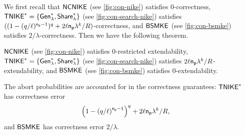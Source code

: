 We first recall that ${\mathsf{NCNIKE}}$ (see \cref{fig:con-nike}) satisfies $0$-correctness, $\mathsf{TNIKE}^*=\{{\mathsf{Gen}}_\lambda^*,{\mathsf{Share}}_\lambda^*\}$ (see \cref{fig:con-search-nike}) satisfies $((1- (q/\ell)^{\mathsf{n_p}-1})^{q} + 2\ell\mathsf{n_p}\lambda^k/R)$-correctness, and ${\mathsf{BSMKE}}$ (see \cref{fig:con-bsmke}) satisfies $2/\lambda$-correctness. Then we have the following theorem.
\begin{theorem}
\label{thm:extend-ncnike}
	${\mathsf{NCNIKE}}$ (see \cref{fig:con-nike}) satisfies $0$-restricted extendability, $\mathsf{TNIKE}^*=\{{\mathsf{Gen}}_\lambda^*,{\mathsf{Share}}_\lambda^*\}$ (see \cref{fig:con-search-nike}) satisfies $2\ell\mathsf{n_p}\lambda^k/R$-extendability, and ${\mathsf{BSMKE}}$ (see \cref{fig:con-bsmke}) satisfies $0$-extendability.
\end{theorem}
The abort probabilities are accounted for in the correctness guarantees: $\mathsf{TNIKE}^*$ has correctness error
\[
\left(1-\left(q/\ell\right)^{\mathsf{n_p}-1}\right)^{q}+2\ell\mathsf{n_p}\lambda^k/R,
\]
and ${\mathsf{BSMKE}}$ has correctness error $2/\lambda$.
